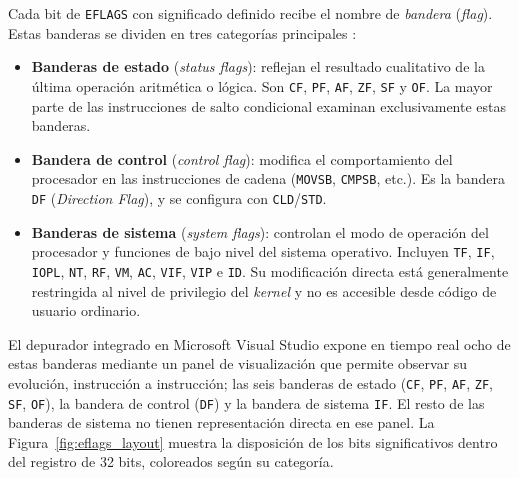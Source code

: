 \documentclass[a4paper,12pt]{article}
\begin{document}
Cada bit de \texttt{EFLAGS} con significado definido recibe el nombre de \textit{bandera} (\textit{flag}). Estas banderas se dividen en tres categorías principales \cite{tanenbaum2013structured, irvine2020assembly}:

\begin{itemize}
  \item \textbf{Banderas de estado} (\textit{status flags}): reflejan el resultado cualitativo de la última operación aritmética o lógica. Son \texttt{CF}, \texttt{PF}, \texttt{AF}, \texttt{ZF}, \texttt{SF} y \texttt{OF}. La mayor parte de las instrucciones de salto condicional examinan exclusivamente estas banderas.
  \item \textbf{Bandera de control} (\textit{control flag}): modifica el comportamiento del procesador en las instrucciones de cadena (\texttt{MOVSB}, \texttt{CMPSB}, etc.). Es la bandera \texttt{DF} (\textit{Direction Flag}), y se configura con \texttt{CLD}/\texttt{STD}.
  \item \textbf{Banderas de sistema} (\textit{system flags}): controlan el modo de operación del procesador y funciones de bajo nivel del sistema operativo. Incluyen \texttt{TF}, \texttt{IF}, \texttt{IOPL}, \texttt{NT}, \texttt{RF}, \texttt{VM}, \texttt{AC}, \texttt{VIF}, \texttt{VIP} e \texttt{ID}. Su modificación directa está generalmente restringida al nivel de privilegio del \textit{kernel} y no es accesible desde código de usuario ordinario.
\end{itemize}

El depurador integrado en Microsoft Visual Studio expone en tiempo real ocho de estas banderas mediante un panel de visualización que permite observar su evolución, instrucción a instrucción; las seis banderas de estado (\texttt{CF}, \texttt{PF}, \texttt{AF}, \texttt{ZF}, \texttt{SF}, \texttt{OF}), la bandera de control (\texttt{DF}) y la bandera de sistema \texttt{IF}. El resto de las banderas de sistema no tienen representación directa en ese panel. La Figura~\ref{fig:eflags_layout} muestra la disposición de los bits significativos dentro del registro de 32 bits, coloreados según su categoría.
\end{document}
